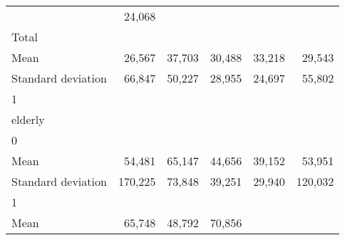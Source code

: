 \begin{tabular}{llllll}
  \multicolumn{1}{r}{} &
  \multicolumn{1}{r}{24,068} \\
\multicolumn{1}{l}{\hspace{3em}Total} &
  \multicolumn{1}{|r}{} &
  \multicolumn{1}{r}{} &
  \multicolumn{1}{r}{} &
  \multicolumn{1}{r}{} &
  \multicolumn{1}{r}{} \\
\multicolumn{1}{l}{\hspace{4em}Mean} &
  \multicolumn{1}{|r}{26,567} &
  \multicolumn{1}{r}{37,703} &
  \multicolumn{1}{r}{30,488} &
  \multicolumn{1}{r}{33,218} &
  \multicolumn{1}{r}{29,543} \\
\multicolumn{1}{l}{\hspace{4em}Standard deviation} &
  \multicolumn{1}{|r}{66,847} &
  \multicolumn{1}{r}{50,227} &
  \multicolumn{1}{r}{28,955} &
  \multicolumn{1}{r}{24,697} &
  \multicolumn{1}{r}{55,802} \\
\multicolumn{1}{l}{\hspace{1em}1} &
  \multicolumn{1}{|r}{} &
  \multicolumn{1}{r}{} &
  \multicolumn{1}{r}{} &
  \multicolumn{1}{r}{} &
  \multicolumn{1}{r}{} \\
\multicolumn{1}{l}{\hspace{2em}elderly} &
  \multicolumn{1}{|r}{} &
  \multicolumn{1}{r}{} &
  \multicolumn{1}{r}{} &
  \multicolumn{1}{r}{} &
  \multicolumn{1}{r}{} \\
\multicolumn{1}{l}{\hspace{3em}0} &
  \multicolumn{1}{|r}{} &
  \multicolumn{1}{r}{} &
  \multicolumn{1}{r}{} &
  \multicolumn{1}{r}{} &
  \multicolumn{1}{r}{} \\
\multicolumn{1}{l}{\hspace{4em}Mean} &
  \multicolumn{1}{|r}{54,481} &
  \multicolumn{1}{r}{65,147} &
  \multicolumn{1}{r}{44,656} &
  \multicolumn{1}{r}{39,152} &
  \multicolumn{1}{r}{53,951} \\
\multicolumn{1}{l}{\hspace{4em}Standard deviation} &
  \multicolumn{1}{|r}{170,225} &
  \multicolumn{1}{r}{73,848} &
  \multicolumn{1}{r}{39,251} &
  \multicolumn{1}{r}{29,940} &
  \multicolumn{1}{r}{120,032} \\
\multicolumn{1}{l}{\hspace{3em}1} &
  \multicolumn{1}{|r}{} &
  \multicolumn{1}{r}{} &
  \multicolumn{1}{r}{} &
  \multicolumn{1}{r}{} &
  \multicolumn{1}{r}{} \\
\multicolumn{1}{l}{\hspace{4em}Mean} &
  \multicolumn{1}{|r}{65,748} &
  \multicolumn{1}{r}{48,792} &
  \multicolumn{1}{r}{70,856} &

\end{tabular}
